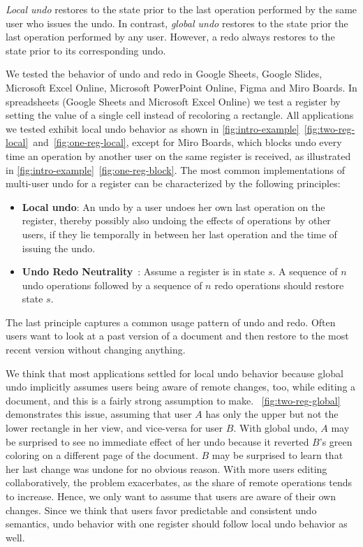 \documentclass[sigplan,10pt]{acmart}
\begin{document}
\emph{Local undo} restores to the state prior to the last operation
performed by the same user who issues the undo.
In contrast, \emph{global undo} restores to the state prior the
last operation performed by any user.
However, a redo always restores to the state prior to its corresponding undo.


We tested the behavior of undo and redo in Google Sheets, Google Slides,
Microsoft Excel Online, Microsoft PowerPoint Online, Figma and Miro Boards.
In spreadsheets (Google Sheets and Microsoft Excel Online)
we test a register by setting the value of a single cell instead of recoloring
a rectangle.
All applications we tested exhibit local undo behavior as shown in
\cref{fig:intro-example}~\ref{fig:two-reg-local}~and~\ref{fig:one-reg-local},
except for Miro Boards, which blocks undo every time an operation
by another user on the same register is received, as illustrated
in \cref{fig:intro-example}~\ref{fig:one-reg-block}.
The most common implementations of multi-user undo for a register
can be characterized by the following principles:

\begin{itemize}
  \item \textbf{Local undo}:
    An undo by a user undoes her own last operation on the register,
    thereby possibly also undoing the effects of operations
    by other users,
    if they lie temporally in between her last operation and the time of
    issuing the undo.
  \item \textbf{Undo Redo Neutrality}~\cite{figma2019multiplayer}:
    Assume a register is in state $s$.
    A sequence of $n$ undo operations followed by a sequence of $n$ redo operations
    should restore state $s$.
\end{itemize}

The last principle captures a common usage pattern of undo and redo.
Often users want to look at a past version of a document and then restore
to the most recent version without changing anything.


We think that most applications settled for local undo behavior because
global undo implicitly assumes users being aware of remote changes, too,
while editing a document, and this is a fairly strong assumption to make.
~\ref{fig:two-reg-global} demonstrates this issue,
assuming that user $A$ has only the upper but not the lower rectangle in her view,
and vice-versa for user $B$.
With global undo, $A$ may be surprised to see no immediate effect of her undo
because it reverted $B$'s green coloring on a different page of the document.
$B$ may be surprised to learn that her last change was undone for no obvious reason.
With more users editing collaboratively, the problem exacerbates, as the
share of remote operations tends to increase.
Hence, we only want to assume that users are aware of their own changes.
Since we think that users favor predictable and consistent undo semantics,
undo behavior with one register should follow local undo behavior as well.
\end{document}
